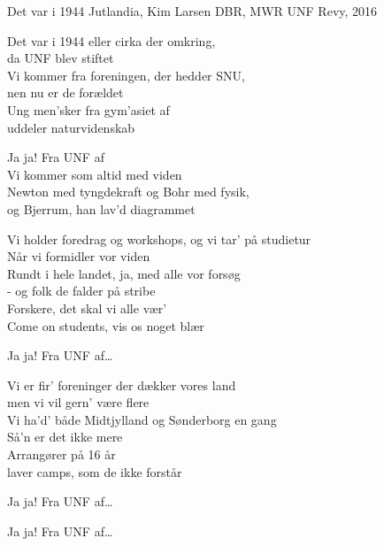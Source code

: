 \begin{song}{Det var i 1944}
  {} %
  {Jutlandia, Kim Larsen} %
  {DBR, MWR} %
  {UNF Revy, 2016} %
  {\NotCCLIed} %

  \begin{SBVerse}
    Det var i 1944 eller cirka der omkring,\\
    da UNF blev stiftet\\
    Vi kommer fra foreningen, der hedder SNU,\\
    nen nu er de forældet\\
    Ung men’sker fra gym’asiet af\\
    uddeler naturvidenskab
  \end{SBVerse}

  \begin{SBChorus}
    Ja ja! Fra UNF af\\
    Vi kommer som altid med viden\\
    Newton med tyngdekraft og Bohr med fysik,\\
    og Bjerrum, han lav’d diagrammet
  \end{SBChorus}

  \begin{SBVerse}
    Vi holder foredrag og workshops, og vi tar’ på studietur\\
    Når vi formidler vor viden\\
    Rundt i hele landet, ja, med alle vor forsøg\\
    - og folk de falder på stribe\\
    Forskere, det skal vi alle vær’\\
    Come on students, vis os noget blær
  \end{SBVerse}

  \begin{SBChorus}
    Ja ja! Fra UNF af\ldots
  \end{SBChorus}

  \begin{SBVerse}
    Vi er fir' foreninger der dækker vores land\\
    men vi vil gern’ være flere\\
    Vi ha’d’ både Midtjylland og Sønderborg en gang\\
    Så’n er det ikke mere\\
    Arrangører på 16 år\\
    laver camps, som de ikke forstår
  \end{SBVerse}

  \begin{SBChorus}
    Ja ja! Fra UNF af\ldots
  \end{SBChorus}

  \begin{SBChorus}
    Ja ja! Fra UNF af\ldots
  \end{SBChorus}
\end{song}